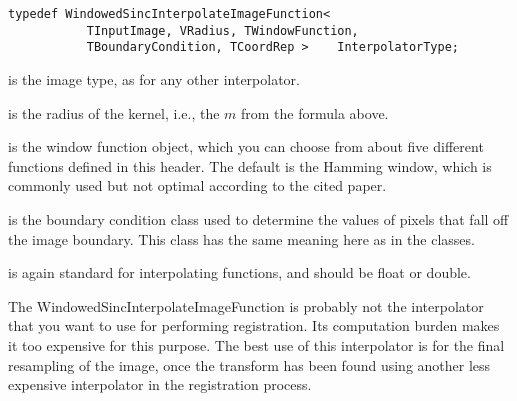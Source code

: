 \small
\begin{verbatim}
typedef WindowedSincInterpolateImageFunction<
           TInputImage, VRadius, TWindowFunction,
           TBoundaryCondition, TCoordRep >    InterpolatorType;

\end{verbatim}
\normalsize

 is the image type, as for any other interpolator.

 is the radius of the kernel, i.e., the $m$ from the
formula above.

 is the window function object, which you can choose from
about five different functions defined in this header. The default is the
Hamming window, which is commonly used but not optimal according to the cited
paper.

 is the boundary condition class used to determine the
values of pixels that fall off the image boundary. This class has the same
meaning here as in the  classes.

 is again standard for interpolating functions, and should be
float or double.


The WindowedSincInterpolateImageFunction is probably not the interpolator that
you want to use for performing registration. Its computation burden makes it
too expensive for this purpose. The best use of this interpolator is for the
final resampling of the image, once the transform has been found using
another less expensive interpolator in the registration process.


